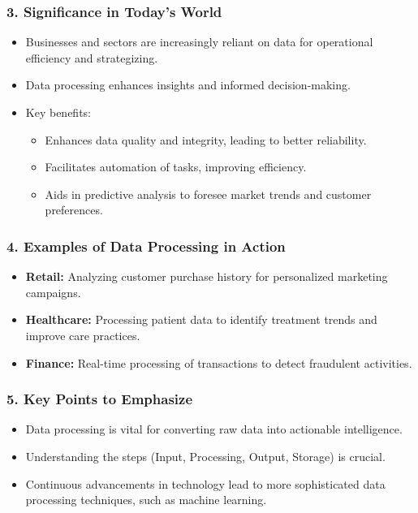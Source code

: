 \documentclass[aspectratio=169]{beamer}
\begin{document}
\begin{frame}[fragile]
    \frametitle{3. Significance in Today’s World}
    \begin{itemize}
        \item Businesses and sectors are increasingly reliant on data for operational efficiency and strategizing.
        \item Data processing enhances insights and informed decision-making.
        \item Key benefits:
            \begin{itemize}
                \item Enhances data quality and integrity, leading to better reliability.
                \item Facilitates automation of tasks, improving efficiency.
                \item Aids in predictive analysis to foresee market trends and customer preferences.
            \end{itemize}
    \end{itemize}
\end{frame}

\begin{frame}[fragile]
    \frametitle{4. Examples of Data Processing in Action}
    \begin{itemize}
        \item \textbf{Retail:} Analyzing customer purchase history for personalized marketing campaigns.
        \item \textbf{Healthcare:} Processing patient data to identify treatment trends and improve care practices.
        \item \textbf{Finance:} Real-time processing of transactions to detect fraudulent activities.
    \end{itemize}
\end{frame}

\begin{frame}[fragile]
    \frametitle{5. Key Points to Emphasize}
    \begin{itemize}
        \item Data processing is vital for converting raw data into actionable intelligence.
        \item Understanding the steps (Input, Processing, Output, Storage) is crucial.
        \item Continuous advancements in technology lead to more sophisticated data processing techniques, such as machine learning.
    \end{itemize}
\end{frame}
\end{document}
